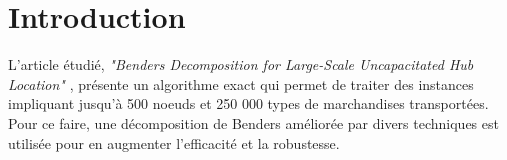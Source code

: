 
\pagebreak

\section*{Introduction}

%

L'article étudié, \textit{"Benders Decomposition for Large-Scale Uncapacitated Hub Location"} \cite{ccl}, présente un algorithme exact qui permet de traiter des instances impliquant jusqu'à 500 noeuds et 250 000 types de marchandises transportées. Pour ce faire, une décomposition de Benders améliorée par divers techniques est utilisée pour en augmenter l'efficacité et la robustesse. 

 
 




